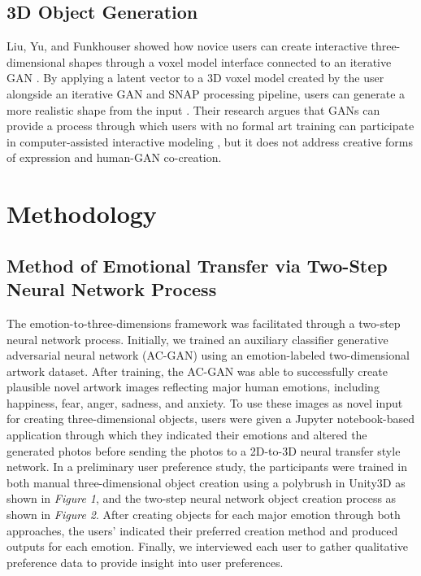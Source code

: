 \documentclass{sigchi}
\begin{document}
\subsection{3D Object Generation}
Liu, Yu, and Funkhouser showed how novice users can create interactive three-dimensional shapes through a voxel model interface connected to an iterative GAN \cite{Liu_2017}. By applying a latent vector to a 3D voxel model created by the user alongside an iterative GAN and SNAP processing pipeline, users can generate a more realistic shape from the input \cite{Liu_2017}. Their research argues that GANs can provide a process through which users with no formal art training can participate in computer-assisted interactive modeling \cite{Liu_2017}, but it does not address creative forms of expression and human-GAN co-creation. 

\section{Methodology}

\subsection{Method of Emotional Transfer via Two-Step Neural Network Process}
The emotion-to-three-dimensions framework was facilitated through a two-step neural network process. Initially, we trained an auxiliary classifier generative adversarial neural network (AC-GAN) using an emotion-labeled two-dimensional artwork dataset. After training, the AC-GAN was able to successfully create plausible novel artwork images reflecting major human emotions, including happiness, fear, anger, sadness, and anxiety. To use these images as novel input for creating three-dimensional objects, users were given a Jupyter notebook-based application through which they indicated their emotions and altered the generated photos before sending the photos to a 2D-to-3D neural transfer style network. In a preliminary user preference study, the participants were trained in both manual three-dimensional object creation using a polybrush in Unity3D as shown in \emph{Figure 1}, and the two-step neural network object creation process as shown in \emph{Figure 2}. After creating objects for each major emotion through both approaches, the users’ indicated their preferred creation method and produced outputs for each emotion. Finally, we interviewed each user to gather qualitative preference data to provide insight into user preferences. 
\end{document}
